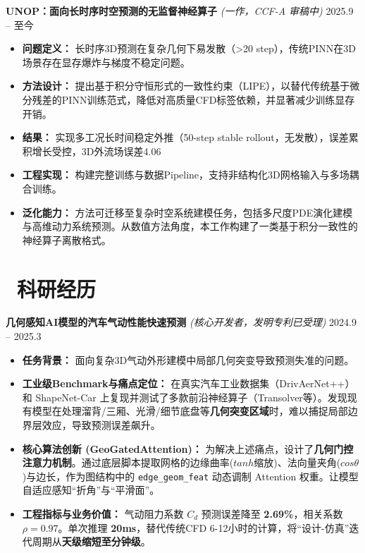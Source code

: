 \documentclass[11pt]{article}
\begin{document}

\textbf{UNOP：面向长时序时空预测的无监督神经算子} 
\textit{(一作，CCF-A 审稿中)} 
\hfill 2025.9 -- 至今
\begin{itemize}
    \item \textbf{问题定义：} 长时序3D预测在复杂几何下易发散（>20 step），传统PINN在3D场景存在显存爆炸与梯度不稳定问题。
    \item \textbf{方法设计：} 提出基于积分守恒形式的一致性约束（LIPE），以替代传统基于微分残差的PINN训练范式，降低对高质量CFD标签依赖，并显著减少训练显存开销。
    \item \textbf{结果：} 实现多工况长时间稳定外推（50-step stable rollout，无发散），误差累积增长受控，3D外流场误差4.06%
    \item \textbf{工程实现：} 构建完整训练与数据Pipeline，支持非结构化3D网格输入与多场耦合训练。
    \item \textbf{泛化能力：} 方法可迁移至复杂时空系统建模任务，包括多尺度PDE演化建模与高维动力系统预测。从数值方法角度，本工作构建了一类基于积分一致性的神经算子离散格式。
\end{itemize}

\section{\makebox[\widthof{\faUsers}][c]{\color{CVBlue}\faUsers}\ 
科研经历}
\textbf{几何感知AI模型的汽车气动性能快速预测} 
\textit{(核心开发者，发明专利已受理)} 
\hfill 2024.9 -- 2025.3
\begin{itemize}
    \item \textbf{任务背景：} 面向复杂3D气动外形建模中局部几何突变导致预测失准的问题。
    \item \textbf{工业级Benchmark与痛点定位：} 在真实汽车工业数据集（DrivAerNet++）和 ShapeNet-Car 上复现并测试了多款前沿神经算子（Transolver等）。发现现有模型在处理溜背/三厢、光滑/细节底盘等\textbf{几何突变区域}时，难以捕捉局部边界层效应，导致预测误差飙升。
    \item \textbf{核心算法创新 (GeoGatedAttention)：} 为解决上述痛点，设计了\textbf{几何门控注意力机制}。通过底层脚本提取网格的边缘曲率($tanh$缩放)、法向量夹角($cos\theta$)与边长，作为图结构中的 \texttt{edge\_geom\_feat} 动态调制 Attention 权重。让模型自适应感知“折角”与“平滑面”。
    \item \textbf{工程指标与业务价值：} 气动阻力系数 $C_d$ 预测误差降至 \textbf{2.69\%}，相关系数 $\rho = 0.97$。单次推理 \textbf{20ms}，替代传统CFD 6-12小时的计算，将“设计-仿真”迭代周期从\textbf{天级缩短至分钟级}。
\end{itemize}
\end{document}
